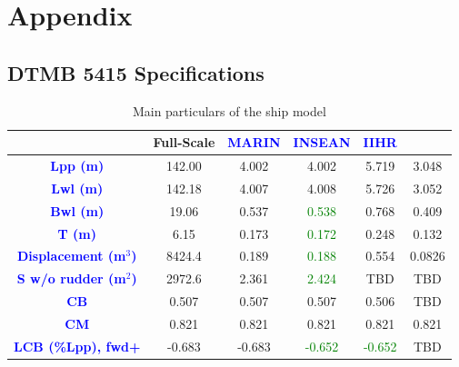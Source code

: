 \documentclass[12pt]{article} %
\begin{document}
\section{Appendix}
\subsection{DTMB 5415 Specifications}
\begin{table}[h!]
    \centering
    \begin{tabular}{|c|c|c|c|c|c|}
        \hline
        & \textbf{Full-Scale} & \textbf{\textcolor{blue}{MARIN}} & \textbf{\textcolor{blue}{INSEAN}} & \textbf{\textcolor{blue}{IIHR}} &\\ \hline
        \textbf{\textcolor{blue}{Lpp (m)}} & 142.00 & 4.002 & 4.002 & 5.719 & 3.048 \\ \hline
        \textbf{\textcolor{blue}{Lwl (m)}} & 142.18 & 4.007 & 4.008 & 5.726 & 3.052 \\ \hline
        \textbf{\textcolor{blue}{Bwl (m)}} & 19.06 & 0.537 & \textcolor{green}{0.538} & 0.768 & 0.409 \\ \hline
        \textbf{\textcolor{blue}{T (m)}} & 6.15 & 0.173 & \textcolor{green}{0.172} & 0.248 & 0.132 \\ \hline
        \textbf{\textcolor{blue}{Displacement (m\(^3\))}} & 8424.4 & 0.189 & \textcolor{green}{0.188} & 0.554 & 0.0826 \\ \hline
        \textbf{\textcolor{blue}{S w/o rudder (m\(^2\))}} & 2972.6 & 2.361 & \textcolor{green}{2.424} & TBD & TBD \\ \hline
        \textbf{\textcolor{blue}{CB}} & 0.507 & 0.507 & 0.507 & 0.506 & TBD \\ \hline
        \textbf{\textcolor{blue}{CM}} & 0.821 & 0.821 & 0.821 & 0.821 & 0.821 \\ \hline
        \textbf{\textcolor{blue}{LCB (\%Lpp), fwd+}} & -0.683 & -0.683 & \textcolor{green}{-0.652} & \textcolor{green}{-0.652} & TBD \\ \hline
    \end{tabular}
    \caption{Main particulars of the ship model}
    \label{tab:main_particulars}
\end{table}
\end{document}
